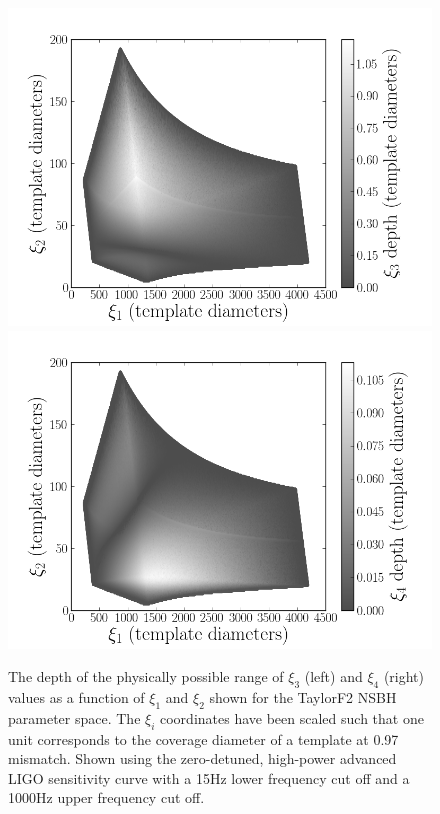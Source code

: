 \begin{figure}
    \centering
    \begin{minipage}[l]{\columnwidth}
    \centering
\includegraphics[width=1.0\textwidth]
{papers/nsbh_effectualness/figure1A.png}
\includegraphics[width=1.0\textwidth]
{papers/nsbh_effectualness/figure1B.png}
\caption{\label{fig:bankF2depths}
The depth of the physically possible range of $\xi_3$ (left) and $\xi_4$ (right)
values as a function of
$\xi_1$ and $\xi_2$ shown for the TaylorF2 \ac{NSBH} parameter space.
The $\xi_i$ coordinates have been scaled
such that one unit corresponds to the coverage diameter of a template
at 0.97 mismatch. Shown using the zero-detuned, high-power advanced LIGO
sensitivity curve with a 15Hz lower frequency cut off
and a 1000Hz upper frequency cut off.}
\end{minipage}
\end{figure}

